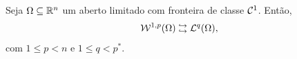 \begin{tbox} \label{thm:compacidade}
    Seja $\Omega \subseteq \mathbb{R}^n$ um aberto limitado com fronteira de classe $\mathcal{C}^1$.
    Então,
    \[
        \mathcal{W}^{1,p}(\Omega) \;\substack{\hookrightarrow \\ \hookrightarrow}\; \mathcal{L}^q(\Omega),
    \]
    com $1 \leqslant p < n$ e $1 \leqslant q < p^*$.
\end{tbox}


